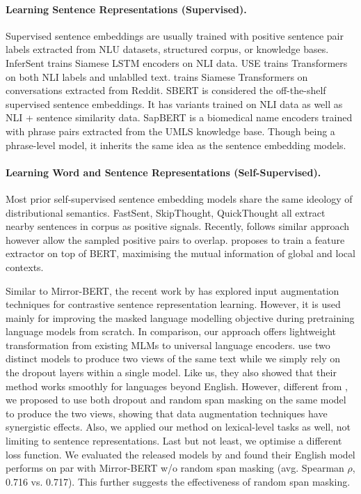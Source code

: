 \documentclass[11pt]{article}
\begin{document}
\paragraph{Learning Sentence Representations (Supervised).}
Supervised sentence embeddings are usually trained with positive sentence pair labels extracted from NLU datasets, structured corpus, or knowledge bases. InferSent trains Siamese LSTM encoders on NLI data. USE trains Transformers on both NLI labels and unlablled text. \citep{yang2018learning} trains Siamese Transformers on conversations extracted from Reddit. SBERT is considered the off-the-shelf supervised sentence embeddings. It has variants trained on NLI data as well as NLI + sentence similarity data. SapBERT is a biomedical name encoders trained with phrase pairs extracted from the UMLS knowledge base. Though being a phrase-level model, it inherits the same idea as the sentence embedding models.

\paragraph{Learning Word and Sentence Representations (Self-Supervised).}
Most prior self-supervised sentence embedding models share the same ideology of distributional semantics. FastSent, SkipThought, QuickThought all extract nearby sentences in corpus as positive signals. Recently, \citep{Giorgi2020DeCLUTRDC} follows similar approach however allow the sampled positive pairs to overlap. \citep{zhang2020unsupervised} proposes to train a feature extractor on top of BERT, maximising the mutual information of global and local contexts. 

Similar to Mirror-BERT, the recent work by \citet{wu2020clear} has explored input augmentation techniques for contrastive sentence representation learning. However, it is used mainly for improving the masked language modelling objective during pretraining language models from scratch. In comparison, our approach offers lightweight transformation from existing MLMs to universal language encoders. \citep{carlsson2021semantic} use two distinct models to produce two views of the same text while we simply rely on the dropout layers within a single model. Like us, they also showed that their method works smoothly for languages beyond English. However, different from \citep{carlsson2021semantic}, we proposed to use both dropout and random span masking on the same model to produce the two views, showing that data augmentation techniques have synergistic effects. Also, we applied our method on lexical-level tasks as well, not limiting to sentence representations. Last but not least, we optimise a different loss function. We evaluated the released models by \citep{carlsson2021semantic} and found their English model performs on par with Mirror-BERT w/o random span masking (avg. Spearman $\rho$, 0.716 vs. 0.717). This further suggests the effectiveness of random span masking.
\end{document}

